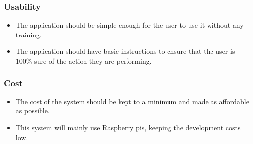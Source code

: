 \documentclass[a4paper,12pt]{article}
\begin{document}
	\subsubsection{Usability}
	\begin{itemize}
		\item The application should be simple enough for the user to use it without any training. 
		\item The application should have basic instructions to ensure that the user is 100\% sure of the action they are performing.
	\end{itemize}
	
	\subsubsection{Cost}
	\begin{itemize}
		\item The cost of the system should be kept to a minimum and made as affordable as possible. 
		\item This system will mainly use Raspberry pis, keeping the development costs low. 
	\end{itemize}
	
	
	
\end{document}
